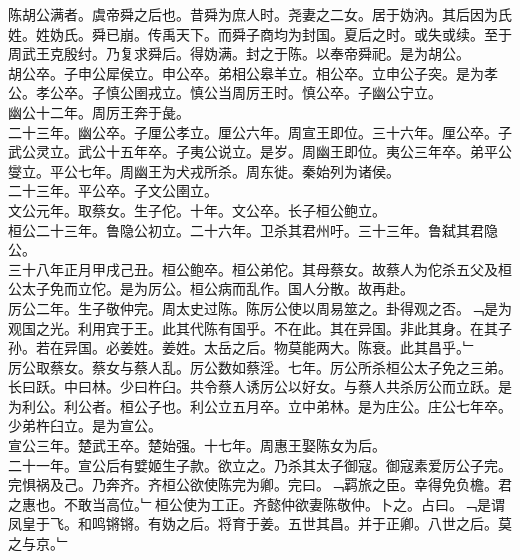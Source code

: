 \documentclass{zhvt-classic}
\begin{document}

\hspace*{2em}陈胡公满者。虞帝舜之后也。昔舜为庶人时。尧妻之二女。居于妫汭。其后因为氏姓。姓妫氏。舜已崩。传禹天下。而舜子商均为封国。夏后之时。或失或续。至于周武王克殷纣。乃复求舜后。得妫满。封之于陈。以奉帝舜祀。是为胡公。\\
\hspace*{2em}胡公卒。子申公犀侯立。申公卒。弟相公皋羊立。相公卒。立申公子突。是为孝公。孝公卒。子慎公圉戎立。慎公当周厉王时。慎公卒。子幽公宁立。\\
\hspace*{2em}幽公十二年。周厉王奔于彘。\\
\hspace*{2em}二十三年。幽公卒。子厘公孝立。厘公六年。周宣王即位。三十六年。厘公卒。子武公灵立。武公十五年卒。子夷公说立。是岁。周幽王即位。夷公三年卒。弟平公燮立。平公七年。周幽王为犬戎所杀。周东徙。秦始列为诸侯。\\
\hspace*{2em}二十三年。平公卒。子文公圉立。\\
\hspace*{2em}文公元年。取蔡女。生子佗。十年。文公卒。长子桓公鲍立。\\
\hspace*{2em}桓公二十三年。鲁隐公初立。二十六年。卫杀其君州吁。三十三年。鲁弑其君隐公。\\
\hspace*{2em}三十八年正月甲戌己丑。桓公鲍卒。桓公弟佗。其母蔡女。故蔡人为佗杀五父及桓公太子免而立佗。是为厉公。桓公病而乱作。国人分散。故再赴。\\
\hspace*{2em}厉公二年。生子敬仲完。周太史过陈。陈厉公使以周易筮之。卦得观之否。﹁是为观国之光。利用宾于王。此其代陈有国乎。不在此。其在异国。非此其身。在其子孙。若在异国。必姜姓。姜姓。太岳之后。物莫能两大。陈衰。此其昌乎。﹂\\
\hspace*{2em}厉公取蔡女。蔡女与蔡人乱。厉公数如蔡淫。七年。厉公所杀桓公太子免之三弟。长曰跃。中曰林。少曰杵臼。共令蔡人诱厉公以好女。与蔡人共杀厉公而立跃。是为利公。利公者。桓公子也。利公立五月卒。立中弟林。是为庄公。庄公七年卒。少弟杵臼立。是为宣公。\\
\hspace*{2em}宣公三年。楚武王卒。楚始强。十七年。周惠王娶陈女为后。\\
\hspace*{2em}二十一年。宣公后有嬖姬生子款。欲立之。乃杀其太子御寇。御寇素爱厉公子完。完惧祸及己。乃奔齐。齐桓公欲使陈完为卿。完曰。﹁羁旅之臣。幸得免负檐。君之惠也。不敢当高位。﹂桓公使为工正。齐懿仲欲妻陈敬仲。卜之。占曰。﹁是谓凤皇于飞。和鸣锵锵。有妫之后。将育于姜。五世其昌。并于正卿。八世之后。莫之与京。﹂\\
\end{document}
